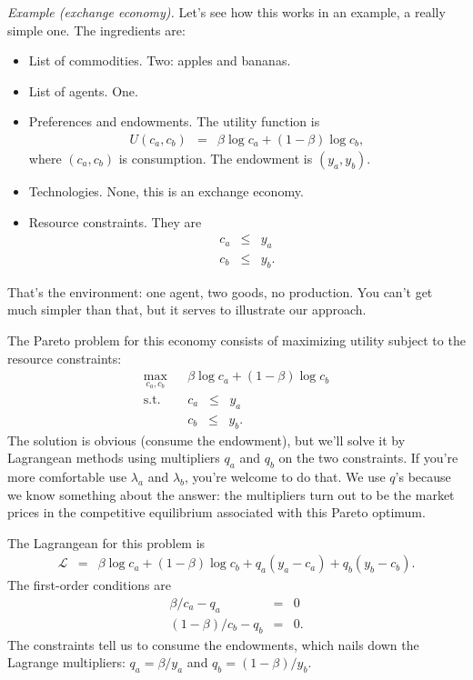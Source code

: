 \documentclass[11pt]{article}
\begin{document}
{\it Example (exchange economy).\/}
Let's see how this works in an example, a really simple one.
The ingredients are:
%
\begin{itemize}
\item List of commodities.   Two:  apples and bananas.
\item List of agents.  One.
\item Preferences and endowments.  The utility function is
\begin{eqnarray*}
    U(c_a,c_b) &=& \beta \log c_a + (1-\beta) \log c_b ,
\end{eqnarray*}
where $(c_a,c_b)$ is consumption.
The endowment is $(y_a,y_b)$.
\item Technologies.  None, this is an exchange economy.
\item Resource constraints.  They are
\begin{eqnarray*}
    c_a &\leq& y_a \\
    c_b &\leq& y_b .
\end{eqnarray*}
\end{itemize}
That's the environment:  one agent, two goods, no production.
You can't get much simpler than that,
but it serves to illustrate our approach.

The Pareto problem for this economy consists of maximizing utility subject
to the resource constraints:
\begin{eqnarray*}
    \max_{c_a,c_b} &&  \beta \log c_a + (1-\beta) \log c_b \\
    \mbox{s.t.}   &&  c_a \;\;\leq\;\; y_a \\
                  &&  c_b \;\;\leq\;\; y_b .
\end{eqnarray*}
The solution is obvious (consume the endowment),
but we'll solve it by Lagrangean methods using
multipliers $q_a$ and $q_b$ on the two constraints.
If you're more comfortable use $\lambda_a$ and $\lambda_b$, you're welcome
to do that.
We use $q$'s because we know something about the answer:
the multipliers turn out to be the market prices
in the competitive equilibrium associated with this Pareto optimum.


The Lagrangean for this problem is
\begin{eqnarray*}
    \mathcal{L} &=&  \beta \log c_a + (1-\beta) \log c_b
                + q_a (y_a - c_a) + q_b (y_b - c_b) .
\end{eqnarray*}
The first-order conditions are
\begin{eqnarray*}
    \beta/c_a - q_a &=& 0 \\
   (1-\beta)/c_b - q_b &=& 0 .
\end{eqnarray*}
The constraints tell us to consume the endowments,
which nails down the Lagrange multipliers:
$ q_a = \beta /y_a$ and $q_b = (1-\beta)/ y_b$.
\end{document}

